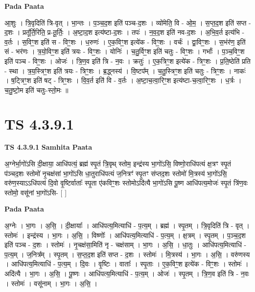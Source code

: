 \documentclass[17pt]{extarticle}
\begin{document}
\textbf{Pada Paata} \newline

आ॒शुः । त्रि॒वृदिति॑ त्रि-वृत् । भा॒न्तः । प॒ञ्च॒द॒श इति॑ पञ्च-द॒शः । व्यो॑मेति॒ वि - ओ॒म॒ । स॒प्त॒द॒श इति॑ सप्त - द॒शः । प्रतू᳚र्ति॒रिति॒ प्र-तू॒र्तिः॒ । अ॒ष्टा॒द॒श इत्य॑ष्टा-द॒शः । तपः॑ । न॒व॒द॒श इति॑ नव-द॒शः । अ॒भि॒व॒र्त इत्य॑भि - व॒र्तः । स॒विꣳ॒॒श इति॑ स - विꣳ॒॒शः । ध॒रुणः॑ । ए॒क॒विꣳ॒॒श इत्ये॑क - विꣳ॒॒शः । वर्चः॑ । द्वा॒विꣳ॒॒शः । स॒भंर॑ण॒ इति॑ सं - भर॑णः । त्र॒यो॒विꣳ॒॒श इति॑ त्रयः - विꣳ॒॒शः । योनिः॑ । च॒तु॒र्विꣳ॒॒श इति॑ चतुः - विꣳ॒॒शः । गर्भाः᳚ । प॒ञ्च॒विꣳ॒॒श इति॑ पञ्च - विꣳ॒॒शः । ओजः॑ । त्रि॒ण॒व इति॑ त्रि - न॒वः । क्रतुः॑ । ए॒क॒त्रिꣳ॒॒श इत्ये॑क - त्रिꣳ॒॒शः । प्र॒ति॒ष्ठेति॑ प्रति - स्था । त्र॒य॒स्त्रिꣳ॒॒श इति॑ त्रयः - त्रिꣳ॒॒शः । ब्र॒द्ध्नस्य॑ । वि॒ष्टप᳚म् । च॒तु॒स्त्रिꣳ॒॒श इति॑ चतुः - त्रिꣳ॒॒शः । नाकः॑ । ष॒ट्त्रिꣳ॒॒श इति॑ षट् - त्रिꣳ॒॒शः । वि॒व॒र्त इति॑ वि - व॒र्तः । अ॒ष्टा॒च॒त्वा॒रिꣳ॒॒श इत्य॑ष्टा-च॒त्वा॒रिꣳ॒॒शः । ध॒र्त्रः । च॒तु॒ष्टो॒म इति॑ चतुः-स्तो॒मः ॥  \newline





\section{ TS 4.3.9.1 }

\textbf{TS 4.3.9.1 } \newline
\textbf{Samhita Paata} \newline

अ॒ग्नेर्भा॒गो॑ऽसि दी॒क्षाया॒ आधि॑पत्यं॒ ब्रह्म॑ स्पृ॒तं त्रि॒वृथ् स्तोम॒ इन्द्र॑स्य भा॒गो॑ऽसि॒ विष्णो॒राधि॑पत्यं क्ष॒त्रꣳ स्पृ॒तं प॑ञ्चद॒शः स्तोमो॑ नृ॒चक्ष॑सां भा॒गो॑ऽसि धा॒तुराधि॑पत्यं ज॒नित्रꣳ॑ स्पृ॒तꣳ स॑प्तद॒शः स्तोमो॑ मि॒त्रस्य॑ भा॒गो॑ऽसि॒ वरु॑ण॒स्याऽऽधि॑पत्यं दि॒वो वृ॒ष्टिर्वाताः᳚ स्पृ॒ता ए॑कविꣳ॒॒शः स्तोमोऽदि॑त्यै भा॒गो॑ऽसि पू॒ष्ण आधि॑पत्य॒मोजः॑ स्पृ॒तं त्रि॑ण॒वः स्तोमो॒ वसू॑नां भा॒गो॑ऽसि- [  ] \newline

\textbf{Pada Paata} \newline

अ॒ग्नेः । भा॒गः । अ॒सि॒ । दी॒क्षायाः᳚ । आधि॑पत्य॒मित्याधि॑ - प॒त्य॒म् । ब्रह्म॑ । स्पृ॒तम् । त्रि॒वृदिति॑ त्रि - वृत् । स्तोमः॑ । इन्द्र॑स्य । भा॒गः । अ॒सि॒ । विष्णोः᳚ । आधि॑पत्य॒मित्याधि॑ - प॒त्य॒म् । क्ष॒त्रम् । स्पृ॒तम् । प॒ञ्च॒द॒श इति॑ पञ्च - द॒शः । स्तोमः॑ । नृ॒चक्ष॑सा॒मिति॑ नृ - चक्ष॑साम् । भा॒गः । अ॒सि॒ । धा॒तुः । आधि॑पत्य॒मित्याधि॑ - प॒त्य॒म् । ज॒नित्र᳚म् । स्पृ॒तम् । स॒प्त॒द॒श इति॑ सप्त - द॒शः । स्तोमः॑ । मि॒त्रस्य॑ । भा॒गः । अ॒सि॒ । वरु॑णस्य । आधि॑पत्य॒मित्याधि॑ - प॒त्य॒म् । दि॒वः । वृ॒ष्टिः । वाताः᳚ । स्पृ॒ताः । ए॒क॒विꣳ॒॒श इत्ये॑क - विꣳ॒॒शः । स्तोमः॑ । अदि॑त्यै । भा॒गः । अ॒सि॒ । पू॒ष्णः । आधि॑पत्य॒मित्याधि॑ - प॒त्य॒म् । ओजः॑ । स्पृ॒तम् । त्रि॒ण॒व इति॑ त्रि - न॒वः । स्तोमः॑ । वसू॑नाम् । भा॒गः । अ॒सि॒ ।  \newline
\end{document}
